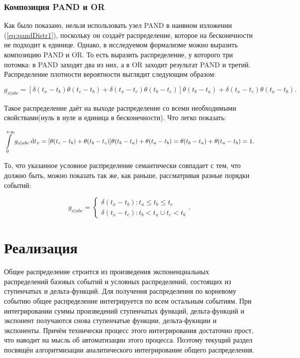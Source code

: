 \documentclass[a4paper, 12pt]{article}
\begin{document}
\subsubsection{Композиция PAND и OR}

Как было показано, нельзя использовать узел PAND в наивном изложении (\ref{eq:pandDistr1}), поскольку он создаёт распределение, которое на бесконечности не подходит к единице. Однако, в исследуемом формализме можно выразить композицию PAND и OR. То есть выразить распределение, у которого три потомка: в PAND заходят два из них, а в OR заходит результат PAND и третий. Распределение плотности вероятности выглядит следующим образом:

\begin{equation}
  \label{eq:pandOrDistr}
  g_{x|abc} = [\delta(t_x - t_b) \theta(t_c - t_b) + \delta(t_x - t_c) \theta(t_b - t_c)] \theta(t_b - t_a) + \delta(t_x - t_c) \theta(t_a - t_b).
\end{equation}

Такое распределение даёт на выходе распределение со всеми необходимыми свойствами(нуль в нуле и единица в бесконечности). Что легко показать:

\begin{equation}
  \label{eq:pandOrProve}
  \int\limits_0^{+\infty} g_{x|abc} \dif t_x
  = [\theta(t_c - t_b) + \theta(t_b - t_c)] \theta(t_b - t_a) + \theta(t_a - t_b)
  = \theta(t_b - t_a) + \theta(t_a - t_b) = 1.
\end{equation}

То, что указанное условное распределение семантически совпадает с тем, что должно быть, можно показать так же, как раньше, рассматривая разные порядки событий:

\begin{equation*}
  g_{x|abc} = \left\{
    \begin{array}{l}
      \delta(t_x - t_b) : t_a \leq t_b \leq t_c \\
      \delta(t_x - t_c) : t_b < t_a \cup t_c < t_b
    \end{array}
  \right. .
\end{equation*}

\section{Реализация}

Общее распределение строится из произведения экспоненциальных распределений базовых событий и условных распределений, состоящих из ступенчатых и дельта-функций. Для получения распределения по корневому событию общее распределение интегрируется по всем остальным событиям. При интегрировании суммы произведений ступенчатых функций, дельта-функций и экспонент получаются снова ступенчатые функции, дельта-фукнции и экспоненты. Причём технически процесс этого интегрирования достаточно прост, что наводит на мысль об автоматизации этого процесса. Поэтому текущий раздел посвящён алгоритмизации аналитического интегрирование общего распределения.
\end{document}
